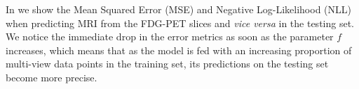 

In  we show the Mean Squared Error (MSE) and Negative Log-Likelihood (NLL) when predicting MRI from the FDG-PET slices and \textit{vice versa} in the testing set.
We notice the immediate drop in the error metrics as soon as the parameter $f$ increases,
which means that as the model is fed with an increasing proportion of multi-view data points in the training set,
its predictions on the testing set become more precise.
%

